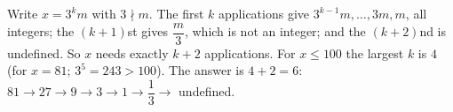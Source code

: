 Write $x=3^km$ with $3\nmid m$. The first $k$ applications give $3^{k-1}m,\dots,3m,m$, all integers; the $(k+1)$st gives $\dfrac m3$, which is not an integer; and the $(k+2)$nd is undefined. So $x$ needs exactly $k+2$ applications. For $x\le100$ the largest $k$ is $4$ (for $x=81$; $3^5=243>100$). The answer is $4+2=\boxed{6}$: $81\to27\to9\to3\to1\to\dfrac13\to$ undefined.
